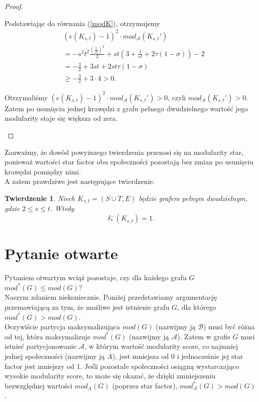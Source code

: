 \documentclass[letterpaper,12pt]{article}
\newtheorem{theorem}{Twierdzenie}
\begin{document}
\begin{proof}
\begin{enumerate}
          Podstawiając do równania (\ref{modK}), otrzymujemy
          \begin{align*}
             & (e(K_{s,t})-1)^2 \cdot mod_{\mathcal{A}}(K_{s,t}')                                  \\
             & = -s^2t^2 \frac{(\frac{1}{st})^2}{2} + st(3 + \frac{1}{st} + 2\tau(1 - \sigma)) - 2 \\
             & = -\frac{3}{2} + 3st + 2st\tau(1 - \sigma)                                          \\
             & \geq -\frac{3}{2} + 3\cdot 4 > 0.
          \end{align*}

          Otrzymaliśmy \((e(K_{s,t})-1)^2 \cdot mod_{\mathcal{A}}(K_{s,t}') > 0\), czyli \(mod_{\mathcal{A}}(K_{s,t}') > 0\). Zatem po usunięciu jednej krawędzi z grafu pełnego dwudzielnego wartość jego modularity staje się większa od zera.
  \end{enumerate}
\end{proof}

Zauważmy, że dowód powyższego twierdzenia przenosi się na modularity star, ponieważ wartości star factor obu społeczności pozostają bez zmian po usunięciu krawędzi pomiędzy nimi.\\
A zatem prawdziwe jest następujące twierdzenie.
\begin{theorem}
  \label{delta_star}
  Niech \(K_{s,t}=(S \cup T, E)\) będzie grafem pełnym dwudzielnym, gdzie \(2 \leq s \leq t\). Wtedy
  \[\delta^{-}_*(K_{s,t}) = 1.\]
\end{theorem}


\section{Pytanie otwarte}
Pytaniem otwartym wciąż pozostaje, czy dla każdego grafu \(G\) \(mod^*(G) \leq mod(G)\)?\\
Naszym zdaniem niekoniecznie. Poniżej przedstawiamy argumentację przemawiającą za tym, że możliwe jest istnienie grafu \(G\), dla którego \(mod^*(G) > mod(G)\).\\

Oczywiście partycja maksymalizująca \(mod(G)\) (nazwijmy ją \(\mathcal{B}\)) musi być różna od tej, która maksymalizuje \(mod^*(G)\) (nazwijmy ją \(\mathcal{A}\)). Zatem w grafie \(G\) musi istnieć partycjonowanie \(\mathcal{A}\), w którym wartość modularity score, co najmniej jednej społeczności (nazwijmy ją \(A\)), jest mniejsza od 0 i jednocześnie jej star factor jest mniejszy od 1. Jeśli pozostałe społeczności osiągną wystarczająco wysokie modularity score, to może się okazać, że dzięki zmniejszeniu bezwzględnej wartości \(mod_A(G)\) (poprzez star factor), \(mod^*_{\mathcal{A}}(G) > mod(G)\).\\
\end{document}
